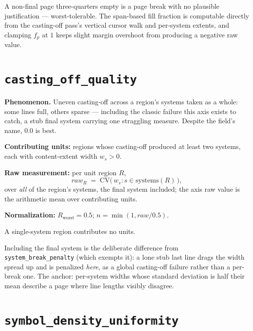 \documentclass[11pt,letterpaper]{report}
\newcounter{requirement}[chapter]
\begin{document}
\begin{rationale}
A non-final page three-quarters empty is a page break with no plausible
justification --- worst-tolerable. The span-based fill fraction is
computable directly from the casting-off pass's vertical cursor walk and
per-system extents, and clamping $f_p$ at $1$ keeps slight margin
overshoot from producing a negative raw value.
\end{rationale}

\section{\texttt{casting\_off\_quality}}
\label{sec:metrics:casting-off}

\textbf{Phenomenon.} Uneven casting-off across a region's systems taken as
a whole: some lines full, others sparse --- including the classic failure
this axis exists to catch, a stub final system carrying one straggling
measure. Despite the field's name, $0.0$ is best.

\begin{requirement}
\label{req:qmc:casting-off}
\textbf{Contributing units:} regions whose casting-off produced at least
two systems, each with content-extent width $w_s > 0$.

\textbf{Raw measurement:} per unit region $R$,
\[
  \mathit{raw}_R \;=\; \mathrm{CV}\bigl(\, w_s : s \in \mathrm{systems}(R) \,\bigr),
\]
over \emph{all} of the region's systems, the final system included; the
axis raw value is the arithmetic mean over contributing units.

\textbf{Normalization:} $R_{\mathrm{worst}} = 0.5$;
$n = \min(1, \mathit{raw} / 0.5)$.

A single-system region contributes no units.
\end{requirement}

\begin{rationale}
Including the final system is the deliberate difference from
\texttt{system\_break\_penalty} (which exempts it): a lone stub last line
drags the width spread up and is penalized \emph{here}, as a global
casting-off failure rather than a per-break one. The anchor: per-system
widths whose standard deviation is half their mean describe a page where
line lengths visibly disagree.
\end{rationale}

\section{\texttt{symbol\_density\_uniformity}}
\label{sec:metrics:symbol-density}
\end{document}
